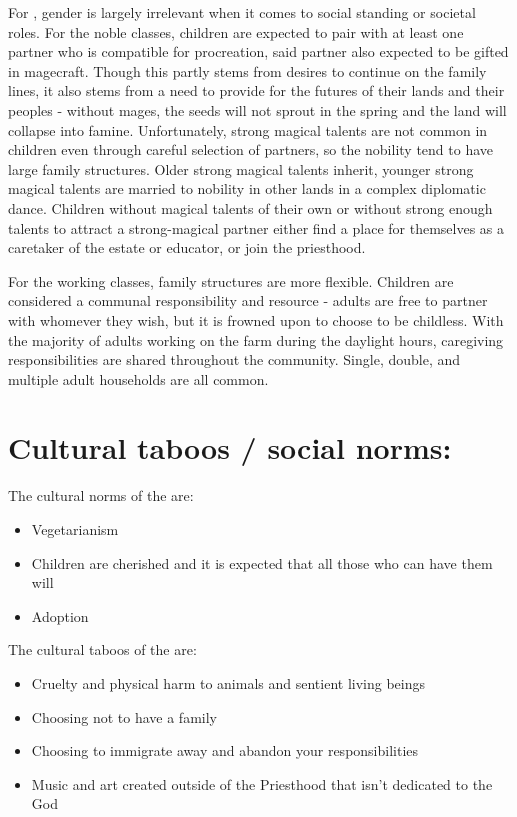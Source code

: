 \documentclass[blue]{GL2020}
\begin{document}
For \pFarm{}, gender is largely irrelevant when it comes to social standing or societal roles.  For the noble classes, children are expected to pair with at least one partner who is compatible for procreation, said partner also expected to be gifted in magecraft.  Though this partly stems from desires to continue on the family lines, it also stems from a need to provide for the futures of their lands and their peoples - without mages, the seeds will not sprout in the spring and the land will collapse into famine.  Unfortunately, strong magical talents are not common in children even through careful selection of partners, so the nobility tend to have large family structures.  Older strong magical talents inherit, younger strong magical talents are married to nobility in other lands in a complex diplomatic dance.  Children without magical talents of their own or without strong enough talents to attract a strong-magical partner either find a place for themselves as a caretaker of the estate or educator, or join the priesthood.

For the working classes, family structures are more flexible.  Children are considered a communal responsibility and resource - adults are free to partner with whomever they wish, but it is frowned upon to choose to be childless.  With the majority of adults working on the farm during the daylight hours, caregiving responsibilities are shared throughout the community.  Single, double, and multiple adult households are all common.       

\section*{Cultural taboos / social norms:}

The cultural norms of the \pFarm{} are:
\begin{itemize}
	\item Vegetarianism
	\item Children are cherished and it is expected that all those who can have them will
	\item Adoption
\end{itemize}

The cultural taboos of the \pFarm{} are:
\begin{itemize}
	\item Cruelty and physical harm to animals and sentient living beings
	\item Choosing not to have a family
	\item Choosing to immigrate away and abandon your responsibilities
	\item Music and art created outside of the Priesthood that isn't dedicated to the God
\end{itemize}
\end{document}
